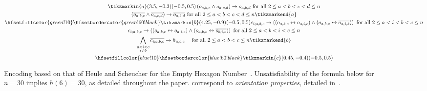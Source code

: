 \begin{figure}
  \caption{Encoding based on that of Heule and Scheucher for the Empty Hexagon Number~\cite{emptyHexagonNumber}. Unsatisfiability of the formula below for $n=30$ implies $h(6) = 30$, as detailed throughout the paper. 
   correspond to \emph{orientation properties}, detailed in~.}
  \label{fig:full-encoding}
  \begin{spreadlines}{16pt} 
\begin{gather}
\tikzmarkin{a}(3.5,-0.3)(-0.5,0.5)
  \left(\orvar_{a, b, c} \land \orvar_{a, c, d}\right) \rightarrow \orvar_{a, b, d} \text{ for all } 2 \leq a < b < c < d \leq n\label{eq:constraint-1}\\
  \left(\ov{\orvar_{a, b, c}} \land \ov{\orvar_{a, c, d}}\right) \rightarrow \ov{\orvar_{a, b, d}} \text{ for all } 2 \leq a < b < c < d \leq n \tikzmarkend{a}\label{eq:constraint-2}\\
\hfsetfillcolor{green!10}
\hfsetbordercolor{green!60!black}
\tikzmarkin{b}(4.25,-0.9)(-0.5,0.5)
  \cvar_{i; a,b, c} \rightarrow \left(\left(\orvar_{a,b,c} \leftrightarrow \orvar_{a, i, c}  \right) \land \left(\orvar_{a,b,c} \leftrightarrow \ov{\orvar_{a, i, b}}  \right)\right) \text{ for all } 2 \leq a < i < b < c \leq n\label{eq:constraint-3}\\
  \cvar_{i; a,b, c} \rightarrow \left(\left(\orvar_{a,b,c} \leftrightarrow \orvar_{a, i, c}  \right) \land \left(\orvar_{a,b,c} \leftrightarrow \ov{\orvar_{b, i, c}}  \right)\right) \text{ for all } 2 \leq a < b < i < c \leq n\label{eq:constraint-4}\\
  \bigwedge_{\substack{a < i < c\\ i \neq b}} \ov{\cvar_{i; a,b,c}} \rightarrow \hvar_{a, b, c} \quad \text{ for all } 2 \leq a < b < c \leq n\label{eq:constraint-5}
  \tikzmarkend{b}\\ 
\hfsetfillcolor{blue!10}
\hfsetbordercolor{blue!60!black}
\tikzmarkin{c}(0.45,-0.4)(-0.5,0.5)

\end{gather}
\end{spreadlines}
\end{figure}
